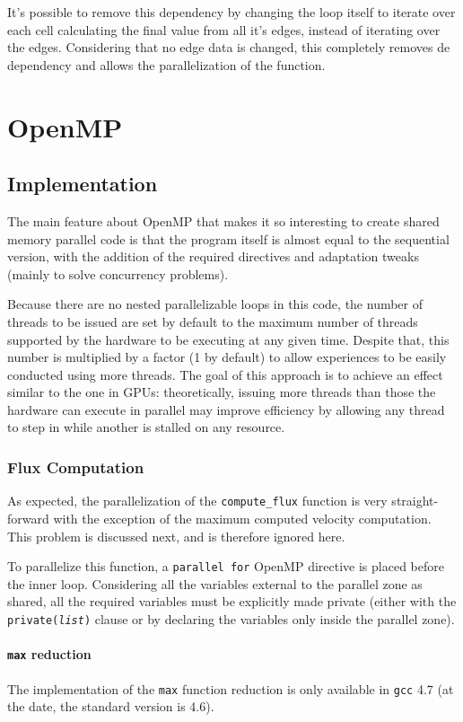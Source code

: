 \documentclass[9pt,twocolumn]{scrartcl}
\newcommand{\paragraphh}[1]{\paragraph{#1\hfill}\hfill

}
\begin{document}
It's possible to remove this dependency by changing the loop itself to iterate over each cell calculating the final value from all it's edges, instead of iterating over the edges. Considering that no edge data is changed, this completely removes de dependency and allows the parallelization of the function.

\section{OpenMP}
\label{sec:openmp}
\subsection{Implementation}
The main feature about OpenMP that makes it so interesting to create shared memory parallel code is that the program itself is almost equal to the sequential version, with the addition of the required directives and adaptation tweaks (mainly to solve concurrency problems).

Because there are no nested parallelizable loops in this code, the number of threads to be issued are set by default to the maximum number of threads supported by the hardware to be executing at any given time. Despite that, this number is multiplied by a factor (1 by default) to allow experiences to be easily conducted using more threads. The goal of this approach is to achieve an effect similar to the one in GPUs: theoretically, issuing more threads than those the hardware can execute in parallel may improve efficiency by allowing any thread to step in while another is stalled on any resource.

\subsubsection{Flux Computation}
As expected, the parallelization of the \texttt{compute\_flux} function is very straight-forward with the exception of the maximum computed velocity computation. This problem is discussed next, and is therefore ignored here.

To parallelize this function, a \texttt{parallel for} OpenMP directive is placed before the inner loop. Considering all the variables external to the parallel zone as shared, all the required variables must be explicitly made private (either with the \texttt{private({\textit{list}})} clause or by declaring the variables only inside the parallel zone).

\paragraphh{\texttt{max} reduction}
The implementation of the \texttt{max} function reduction is only available in \texttt{gcc} 4.7 (at the date, the standard version is 4.6).
\end{document}
